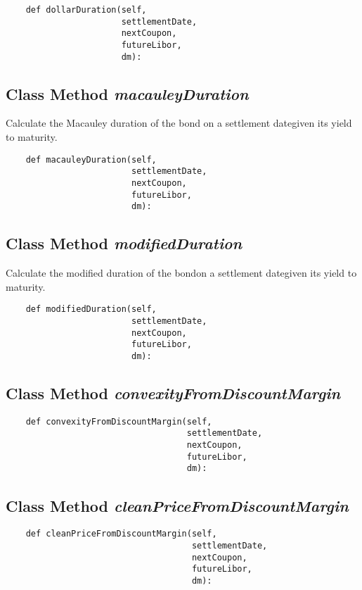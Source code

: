 \documentclass[twoside,11pt]{book}
\begin{document}
\begin{lstlisting}
    def dollarDuration(self,
                       settlementDate,
                       nextCoupon,
                       futureLibor,
                       dm):
\end{lstlisting}

\subsection{Class Method {\it macauleyDuration}}
Calculate the Macauley duration of the bond on a settlement dategiven its yield to maturity. 

\begin{lstlisting}
    def macauleyDuration(self,
                         settlementDate,
                         nextCoupon,
                         futureLibor,
                         dm):
\end{lstlisting}

\subsection{Class Method {\it modifiedDuration}}
Calculate the modified duration of the bondon a settlement dategiven its yield to maturity. 

\begin{lstlisting}
    def modifiedDuration(self,
                         settlementDate,
                         nextCoupon,
                         futureLibor,
                         dm):
\end{lstlisting}

\subsection{Class Method {\it convexityFromDiscountMargin}}


\begin{lstlisting}
    def convexityFromDiscountMargin(self,
                                    settlementDate,
                                    nextCoupon,
                                    futureLibor,
                                    dm):
\end{lstlisting}

\subsection{Class Method {\it cleanPriceFromDiscountMargin}}


\begin{lstlisting}
    def cleanPriceFromDiscountMargin(self,
                                     settlementDate,
                                     nextCoupon,
                                     futureLibor,
                                     dm):
\end{lstlisting}
\end{document}
